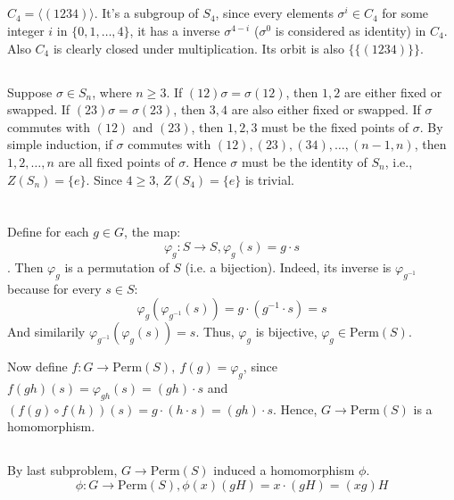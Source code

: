 \documentclass[12pt]{article}
\begin{document}
\subsection{}
$C_4=\langle (1234)\rangle$. It's a subgroup of $S_4$, since every elements $\sigma^i\in C_4$ for some integer $i$ in $\{0,1,\dots,4\}$, it has a inverse $\sigma^{4-i}$ ($\sigma^0$ is considered as identity) in $C_4$. Also $C_4$ is clearly closed under multiplication. Its orbit is also $\{\{(1234)\}\}$.
\subsection{}
Suppose $\sigma\in S_n$, where $n\ge 3$. If $(12)\sigma=\sigma(12)$, then $1,2$ are either fixed or swapped. If $(23)\sigma=\sigma(23)$, then $3,4$ are also either fixed or swapped. If $\sigma$ commutes with $(12)$ and $(23)$, then $1,2,3$ must be the fixed points of $\sigma$. By simple induction, if $\sigma$ commutes with $(12),(23),(34),\dots,(n-1,n)$, then $1,2,\dots,n$ are all fixed points of $\sigma$. Hence $\sigma$ must be the identity of $S_n$, i.e., $Z(S_n)=\{e\}$. Since $4\ge3$, $Z(S_4)=\{e\}$ is trivial.


\section{}
\subsection{}
Define for each $g\in G$, the map:
$$\varphi_g: S\rightarrow S,\varphi_g(s)=g\cdot s$$. Then $\varphi_g$ is a permutation of $S$ (i.e. a bijection). Indeed, its inverse is $\varphi_{g^{-1}}$ because for every $s\in S$:
$$\varphi_g(\varphi_{g^{-1}}(s))=g\cdot(g^{-1}\cdot s)=s$$
And similarily $\varphi_{g^{-1}}(\varphi_{g}(s))=s$. Thus, $\varphi_g$ is bijective, $\varphi_g\in \mathrm{Perm}(S)$. 

Now define $f:G\rightarrow \mathrm{Perm}(S),\ f(g)=\varphi_g$, since $f(gh)(s)=\varphi_{gh}(s)=(gh)\cdot s$ and $(f(g)\circ f(h))(s)=g\cdot (h\cdot s)=(gh)\cdot s$. Hence, $G\rightarrow \mathrm{Perm}(S)$ is a homomorphism.

\subsection{}
By last subproblem, $G\rightarrow\mathrm{Perm}(S)$ induced a homomorphism $\phi$.
$$\phi:G\rightarrow\mathrm{Perm}(S),\phi(x)(gH)=x\cdot(gH)=(xg)H$$
\end{document}
